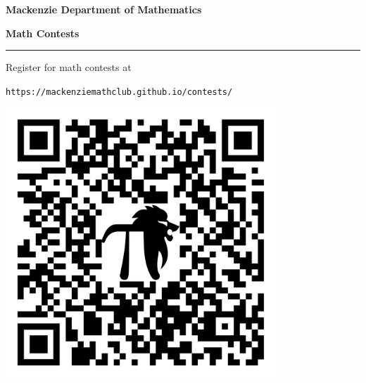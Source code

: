 \documentclass[letterpaper,landscape,14pt]{extarticle}
\begin{document}
	\centering

	{\huge\textbf{Mackenzie Department of Mathematics}}

	{\Huge\textbf{Math Contests}}

	\vspace{1ex}

	\hrule
	\LARGE
	Register for math contests at

	\texttt{https://mackenziemathclub.github.io/contests/}

	\includegraphics[height=4in]{QRCode}
\end{document}
